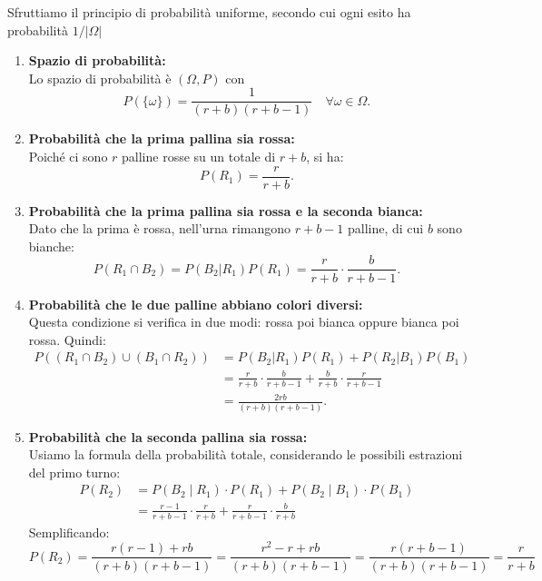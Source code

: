 Sfruttiamo il principio di probabilità uniforme, secondo cui ogni esito ha probabilità \(1/|\Omega|\)

\begin{enumerate}[label=(\alph*)]
    \item \textbf{Spazio di probabilità:}\\
    Lo spazio di probabilità è \((\Omega, P)\) con
    \[
        P(\{ \omega \}) = \frac{1}{(r+b)(r+b-1)} \quad \forall \omega \in \Omega.
    \]
    
    \item \textbf{Probabilità che la prima pallina sia rossa:}\\[1mm]
    Poiché ci sono \(r\) palline rosse su un totale di \(r+b\), si ha:
    \[
        P(R_1) = \frac{r}{r+b}.
    \]
    
    \item \textbf{Probabilità che la prima pallina sia rossa e la seconda bianca:}\\[1mm]
    Dato che la prima è rossa, nell’urna rimangono \(r+b-1\) palline, di cui \(b\) sono bianche:
    \[
        P(R_1 \cap B_2) = P(B_2 | R_1) P(R_1) =\frac{r}{r+b} \cdot \frac{b}{r+b-1}.
    \]
    
    \item \textbf{Probabilità che le due palline abbiano colori diversi:}\\[1mm]
    Questa condizione si verifica in due modi: rossa poi bianca oppure bianca poi rossa. Quindi:
    \[
        \begin{split}
            P((R_1 \cap B_2)\cup (B_1 \cap R_2)) & =P(B_2 | R_1) P(R_1) + P(R_2 | B_1) P(B_1)\\
                    &= \frac{r}{r+b} \cdot \frac{b}{r+b-1} + \frac{b}{r+b} \cdot \frac{r}{r+b-1} \\
                    &= \frac{2rb}{(r+b)(r+b-1)}.
        \end{split}
    \]
    \item \textbf{Probabilità che la seconda pallina sia rossa:}\\[1mm]
    Usiamo la formula della probabilità totale, considerando le possibili estrazioni del primo turno:
    \[
    \begin{split}
    P(R_2) &= P(B_2 \mid R_1) \cdot P(R_1)  + P(B_2 \mid B_1) \cdot P(B_1)\\[1mm]
    &= \frac{r-1}{r+b-1} \cdot \frac{r}{r+b} + \frac{r}{r+b-1} \cdot \frac{b}{r+b}
    \end{split}
    \]
    Semplificando:
    \[
    P(R_2) = \frac{r(r-1) + rb}{(r+b)(r+b-1)} = \frac{r^2 - r + rb}{(r+b)(r+b-1)} = \frac{r(r+b-1)}{(r+b)(r+b-1)} = \frac{r}{r+b}
    \]
\end{enumerate}

